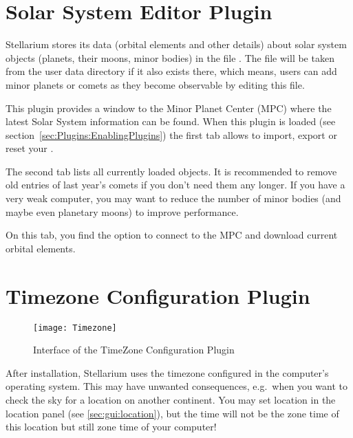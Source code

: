 % 


\newpage

\section{Solar System Editor Plugin}
\label{sec:plugins:SolarSystemEditor}

Stellarium stores its data (orbital elements and other details) about
solar system objects (planets, their moons, minor bodies) in the file
. The file will be taken from the user data
directory if it also exists there, which means, users can add minor
planets or comets as they become observable by editing this file.


This plugin provides a window to the Minor Planet Center (MPC) where the
latest Solar System information can be found. When this plugin is
loaded (see section~\ref{sec:Plugins:EnablingPlugins}) the first tab
allows to import, export or reset your .

The second tab lists all currently loaded objects.  It is recommended
to remove old entries of last year's comets if you don't need them any
longer.
If you have a very weak computer, you may want to reduce the number of
minor bodies (and maybe even planetary moons) to improve performance.

On this tab, you find the option to connect to the MPC and download current orbital elements. 


\newpage

\section{Timezone Configuration Plugin}
\label{sec:plugins:Timezones}


\begin{figure}[h]\centering
\texttt{[image: Timezone]}
\label{fig:plugins:Timezones}
\caption{Interface of the TimeZone Configuration Plugin}
\end{figure}


\noindent After installation, Stellarium uses the timezone configured in the
computer's operating system. This may have unwanted consequences,
e.g.\ when you want to check the sky for a location on another
continent. You may set location in the location panel (see
\ref{sec:gui:location}), but the time will not be the zone time of
this location but still zone time of your computer!

